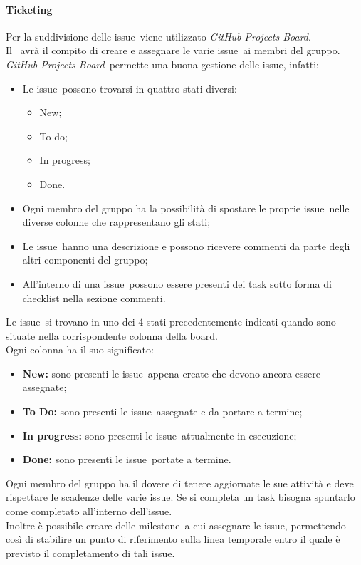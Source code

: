       \paragraph{Ticketing}
        Per la suddivisione delle issue\glo\ viene utilizzato \textit{GitHub Projects Board}\glo.\\
        Il \roleProjectManagerLow\ avrà il compito di creare e assegnare le varie issue\glo\ ai membri del gruppo.\\
        \textit{GitHub Projects Board}\glo\ permette una buona gestione delle issue\glo, infatti:
        \begin{itemize}
          \item Le issue\glo\ possono trovarsi in quattro stati diversi:
          \begin{itemize}
            \item New;
            \item To do;
            \item In progress;
            \item Done.
          \end{itemize}
          \item Ogni membro del gruppo ha la possibilità di spostare le proprie issue\glo\ nelle diverse colonne che rappresentano gli stati;
          \item Le issue\glo\ hanno una descrizione e possono ricevere commenti da parte degli altri componenti del gruppo;
          \item All'interno di una issue\glo\ possono essere presenti dei task sotto forma di checklist nella sezione commenti.
        \end{itemize}
        Le issue\glo\ si trovano in uno dei 4 stati precedentemente indicati quando sono situate nella corrispondente colonna della board.\\
        Ogni colonna ha il suo significato:
        \begin{itemize}
          \item \textbf{New:} sono presenti le issue\glo\ appena create che devono ancora essere assegnate;
          \item \textbf{To Do:} sono presenti le issue\glo\ assegnate e da portare a termine;
          \item \textbf{In progress:} sono presenti le issue\glo\ attualmente in esecuzione;
          \item \textbf{Done:} sono presenti le issue\glo\ portate a termine.
        \end{itemize}
        Ogni membro del gruppo ha il dovere di tenere aggiornate le sue attività e deve rispettare le scadenze delle varie issue\glo.
        Se si completa un task bisogna spuntarlo come completato all'interno dell'issue\glo.\\
        Inoltre è possibile creare delle milestone\glo\ a cui assegnare le issue\glo, permettendo così di stabilire un punto di riferimento 
        sulla linea temporale entro il quale è previsto il completamento di tali issue\glo.

